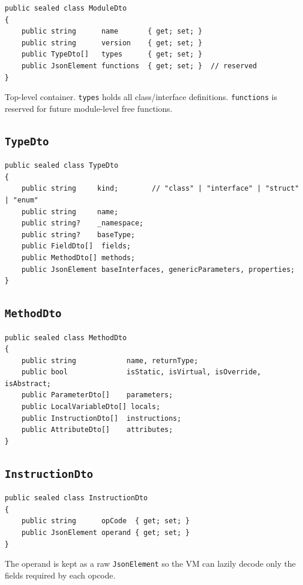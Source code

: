 \documentclass[11pt,a4paper]{article}
\newcommand{\code}[1]{\texttt{\small #1}}
\newcommand{\typename}[1]{\textcolor{typecolor}{\texttt{\small #1}}}
\begin{document}
\begin{lstlisting}[style=cs]
public sealed class ModuleDto
{
    public string      name       { get; set; }
    public string      version    { get; set; }
    public TypeDto[]   types      { get; set; }
    public JsonElement functions  { get; set; }  // reserved
}
\end{lstlisting}

Top-level container. \code{types} holds all class/interface definitions.
\code{functions} is reserved for future module-level free functions.

\subsection{\texttt{TypeDto}}

\begin{lstlisting}[style=cs]
public sealed class TypeDto
{
    public string     kind;        // "class" | "interface" | "struct" | "enum"
    public string     name;
    public string?    _namespace;
    public string?    baseType;
    public FieldDto[]  fields;
    public MethodDto[] methods;
    public JsonElement baseInterfaces, genericParameters, properties;
}
\end{lstlisting}

\subsection{\texttt{MethodDto}}

\begin{lstlisting}[style=cs]
public sealed class MethodDto
{
    public string            name, returnType;
    public bool              isStatic, isVirtual, isOverride, isAbstract;
    public ParameterDto[]    parameters;
    public LocalVariableDto[] locals;
    public InstructionDto[]  instructions;
    public AttributeDto[]    attributes;
}
\end{lstlisting}

\subsection{\texttt{InstructionDto}}

\begin{lstlisting}[style=cs]
public sealed class InstructionDto
{
    public string      opCode  { get; set; }
    public JsonElement operand { get; set; }
}
\end{lstlisting}

The operand is kept as a raw \typename{JsonElement} so the VM can lazily
decode only the fields required by each opcode.
\end{document}
